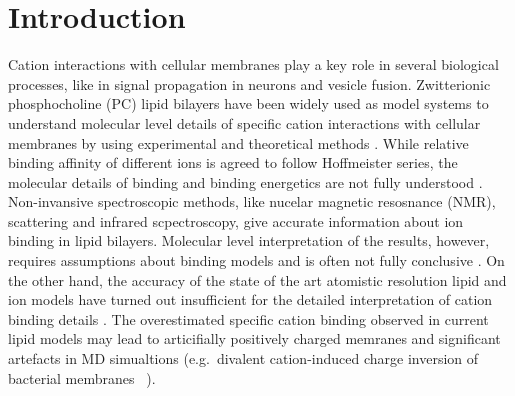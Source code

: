 \documentclass[aip,jcp,twocolumn]{revtex4}
\begin{document}
\section{Introduction}
Cation interactions with cellular membranes play a key role in several biological processes,
like in signal propagation in neurons and vesicle fusion.
Zwitterionic phosphocholine (PC) lipid bilayers have been widely used as model systems
to understand molecular level details of specific cation interactions with
cellular membranes by using experimental \cite{cevc90,tocanne90,binder02,pabst07,uhrikova08}
and theoretical methods \cite{bockmann03,bockmann04,Berkowitz12,??} 
.
While relative binding affinity of different ions is agreed to follow Hoffmeister
series, the molecular details of binding and binding energetics are
not fully understood \cite{cevc90,tocanne90,seelig90,binder02,catte16,??}.
Non-invansive spectroscopic methods, like nucelar magnetic resosnance (NMR), scattering
and infrared scpectroscopy, give accurate information about ion binding
in lipid bilayers\cite{hauser76,hauser78,herbette84,akutsu81,altenbach84,binder02}. 
Molecular level interpretation of the results, however, requires assumptions
about binding models and is often not fully conclusive \cite{??}.
On the other hand, the accuracy of the state of the art atomistic resolution lipid and ion models
have turned out insufficient for the detailed interpretation of cation binding details \cite{catte16}.
The overestimated specific cation binding observed in current lipid models \cite{catte16}
may lead to articifially positively charged memranes and significant artefacts in
MD simualtions (e.g.~divalent cation-induced charge inversion of bacterial membranes~\cite{Luan2016}
). 
\end{document}
